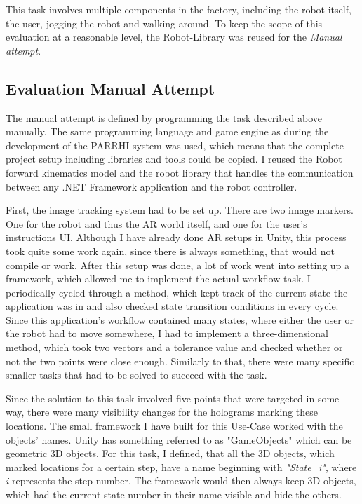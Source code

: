 This task involves multiple components in the factory, including the robot itself, the user, jogging the robot and walking around. To keep the scope of this evaluation at a reasonable level, the Robot-Library was reused for the \textit{Manual attempt}. 


\subsection{Evaluation Manual Attempt}

The manual attempt is defined by programming the task described above manually. The same programming language and game engine as during the development of the PARRHI system was used, which means that the complete project setup including libraries and tools could be copied. I reused the Robot forward kinematics model and the robot library that handles the communication between any .NET Framework application and the robot controller. 

First, the image tracking system had to be set up. There are two image markers. One for the robot and thus the AR world itself, and one for the user's instructions UI. Although I have already done AR setups in Unity, this process took quite some work again, since there is always something, that would not compile or work. After this setup was done, a lot of work went into setting up a framework, which allowed me to implement the actual workflow task. I periodically cycled through a method, which kept track of the current state the application was in and also checked state transition conditions in every cycle. Since this application's workflow contained many states, where either the user or the robot had to move somewhere, I had to implement a three-dimensional  method, which took two vectors and a tolerance value and checked whether or not the two points were close enough. Similarly to that, there were many specific smaller tasks that had to be solved to succeed with the task.

Since the solution to this task involved five points that were targeted in some way, there were many visibility changes for the holograms marking these locations. The small framework I have built for this Use-Case worked with the objects' names. Unity has something referred to as "GameObjects" which can be geometric 3D objects. For this task, I defined, that all the 3D objects, which marked locations for a certain step, have a name beginning with \textit{"State\_i"}, where \textit{i} represents the step number. The framework would then always keep 3D objects, which had the current state-number in their name visible and hide the others.

